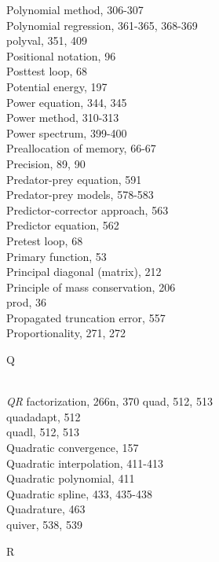 \documentclass[../main.tex]{subfiles}
\begin{document}
\begin{multicols}{3}
    Polynomial method, 306-307\\
    Polynomial regression, 361-365, 368-369\\
    polyval, 351, 409\\
    Positional notation, 96\\
    Posttest loop, 68\\
    Potential energy, 197\\
    Power equation, 344, 345\\
    Power method, 310-313\\
    Power spectrum, 399-400\\
    Preallocation of memory, 66-67\\
    Precision, 89, 90\\
    Predator-prey equation, 591\\
    Predator-prey models, 578-583\\
    Predictor-corrector approach, 563\\
    Predictor equation, 562\\
    Pretest loop, 68\\
    Primary function, 53\\
    Principal diagonal (matrix), 212\\
    Principle of mass conservation, 206\\
    prod, 36\\
    Propagated truncation error, 557\\
    Proportionality, 271, 272\vspace*{2mm}\\
    \begin{huge} Q \end{huge}\\
    \textit{QR} factorization, 266n, 370
    quad, 512, 513\\
    quadadapt, 512\\
    quadl, 512, 513\\
    Quadratic convergence, 157\\
    Quadratic interpolation, 411-413\\
    Quadratic polynomial, 411\\
    Quadratic spline, 433, 435-438\\
    Quadrature, 463\\
    quiver, 538, 539\vspace*{2mm}\\
    \begin{huge} R \end{huge}\\

\end{multicols}
\end{document}
